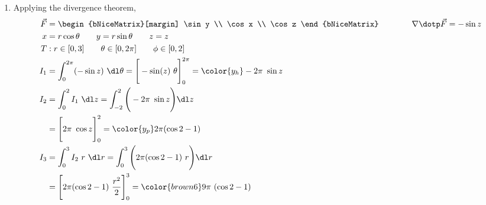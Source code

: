 \begin{enumerate}
     \item Applying the divergence theorem,
           \begin{align}
                \vec{F} & = \begin{bNiceMatrix}[margin]
                                 \sin y \\ \cos x \\ \cos z
                            \end{bNiceMatrix} \qquad\qquad
                \nabla \dotp \vec{F} = -\sin z                                     \\
                x       & = r\cos \theta \qquad y = r\sin \theta
                \qquad z = z                                                       \\
                T       & : r \in [0, 3] \qquad \theta \in [0, 2\pi]
                \qquad \phi \in [0, 2]                                             \\
                I_1     & = \int_{0}^{2\pi} (-\sin z) \ \dl \theta
                = \Bigg[ -\sin(z)\ \theta \Bigg]_{0}^{2\pi}
                = {\color{y_h} -2\pi\ \sin z}                                      \\
                I_2     & = \int_{0}^{2} I_1 \ \dl z
                = \int_{-2}^{2} \Bigg( -2\pi\ \sin z \Bigg) \dl z                  \\
                        & = \Bigg[ 2\pi\ \cos z \Bigg]_{0}^{2}
                = {\color{y_p} 2\pi (\cos 2 - 1) }                                 \\
                I_3     & = \int_{0}^{3} I_2\ r\ \dl r = \int_{0}^{3}
                \Bigg( 2\pi (\cos 2 - 1)\ r \Bigg) \dl r                           \\
                        & = \Bigg[ 2\pi (\cos 2 - 1)\ \frac{r^2}{2} \Bigg]_{0}^{3}
                = {\color{brown6} 9\pi\ (\cos 2 - 1)}
           \end{align}


\end{enumerate}
